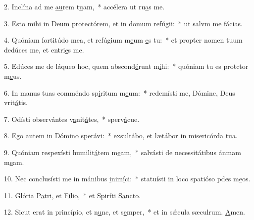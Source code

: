 2. Inclína ad me \uline{au}rem t\uline{u}am,~* accélera ut ru\uline{a}s me.\par 
3. Esto mihi in Deum protectórem, et in d\uline{o}mum ref\uline{ú}gii:~* ut salvm me f\uline{á}cias.\par 
4. Quóniam fortitúdo mea, et refúgium m\uline{e}um \uline{e}s tu:~* et propter nomen tuum dedúces me, et entri\uline{e}s me.\par 
5. Edúces me de láqueo hoc, quem abscond\uline{é}runt m\uline{i}hi:~* quóniam tu es protctor m\uline{e}us.\par 
6. In manus tuas comméndo sp\uline{í}ritum m\uline{e}um:~* redemísti me, Dómine, Deus vrit\uline{á}tis.\par 
7. Odísti observántes v\uline{a}nit\uline{á}tes,~* sperv\uline{á}cue.\par 
8. Ego autem in Dómin\uline{o} sper\uline{á}vi:~* exsultábo, et lætábor in misericórda t\uline{u}a.\par 
9. Quóniam respexísti humilit\uline{á}tem m\uline{e}am,~* salvásti de necessitátibus ánmam m\uline{e}am.\par 
10. Nec conclusísti me in mánibus \uline{i}nim\uline{í}ci:~* statuísti in loco spatióso pdes m\uline{e}os.\par 
11. Glória P\uline{a}tri, et F\uline{í}lio,~* et Spiríti S\uline{a}ncto.\par 
12. Sicut erat in princípio, et n\uline{u}nc, et s\uline{e}mper,~* et in sǽcula sæculrum. \uline{A}men.\par 
